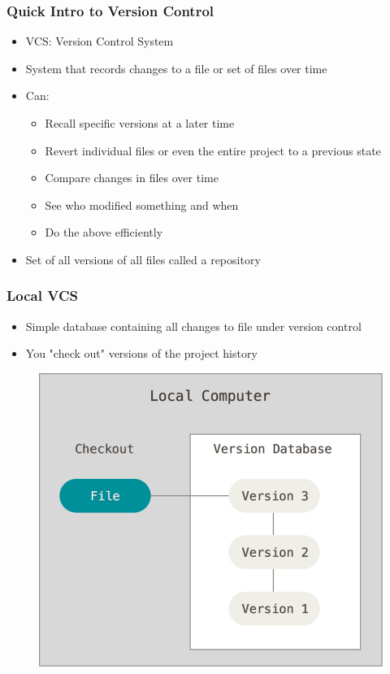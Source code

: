 \documentclass{beamer}
\begin{document}

\begin{frame}
	\frametitle{Quick Intro to Version Control}
	\begin{itemize}
		\item{VCS: Version Control System}
		\item{System that records changes to a file or set of files over time}
		\item{Can:}
		\begin{itemize}
			\item{Recall specific versions at a later time}
			\item{Revert individual files or even the entire project to a previous state}
			\item{Compare changes in files over time}
			\item{See who modified something and when}
			\item{Do the above efficiently}
		\end{itemize}
		\item{Set of all versions of all files called a repository}
	\end{itemize}
\end{frame}

\begin{frame}
	\frametitle{Local VCS}
	\begin{itemize}
		\item{Simple database containing all changes to file under version control}
		\item{You "check out" versions of the project history}
	\end{itemize}
	\begin{figure}
		\includegraphics[scale=0.25]{Local_VCS-0.png}
	\end{figure}
\end{frame}
\end{document}

